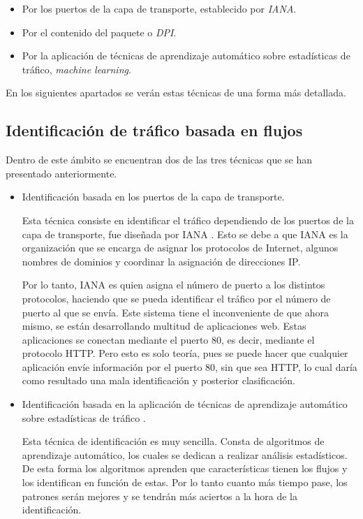 \begin{itemize}
\item Por los puertos de la capa de transporte, establecido por \textit{IANA}. \cite{iana}
\item Por el contenido del paquete o \textit{DPI}. \cite{payload}
\item Por la aplicación de técnicas de aprendizaje automático sobre estadísticas de tráfico, \textit{machine 
learning}. \cite{learning}
\end{itemize}

\intro En los siguientes apartados se verán estas técnicas de una forma más detallada.

\subsection{Identificación de tráfico basada en flujos}

Dentro de este ámbito se encuentran dos de las tres técnicas que se han presentado anteriormente.
\begin{itemize}

\item Identificación basada en los puertos de la capa de transporte. \cite{iana}

\intro Esta técnica consiste en identificar el tráfico dependiendo de los puertos de la capa de transporte, 
fue diseñada por IANA \cite{ianaexplicacion}. Esto se debe a que IANA es la organización que se encarga de 
asignar los protocolos de Internet, algunos nombres de dominios y coordinar la asignación de direcciones IP. 

\intro Por lo tanto, IANA es quien asigna el número de puerto a los distintos protocolos, haciendo que se pueda 
identificar el tráfico por el número de puerto al que se envía. Este sistema tiene el inconveniente de que 
ahora mismo, se están desarrollando multitud de aplicaciones web. Estas aplicaciones se conectan mediante el 
puerto 80, es decir, mediante el protocolo HTTP. Pero esto es solo teoría, pues se puede hacer que cualquier 
aplicación envíe información por el puerto 80, sin que sea HTTP, lo cual daría como resultado una mala 
identificación y posterior clasificación.

\item Identificación basada en la aplicación de técnicas de aprendizaje automático sobre estadísticas 
de tráfico \cite{learning}.

\intro Esta técnica de identificación es muy sencilla. Consta de algoritmos de aprendizaje automático, 
los cuales se dedican a realizar análisis estadísticos. De esta forma los algoritmos aprenden que características 
tienen los flujos y los identifican en función de estas. Por lo tanto cuanto más tiempo pase, los patrones serán 
mejores y se tendrán más aciertos a la hora de la identificación.
\end{itemize}

